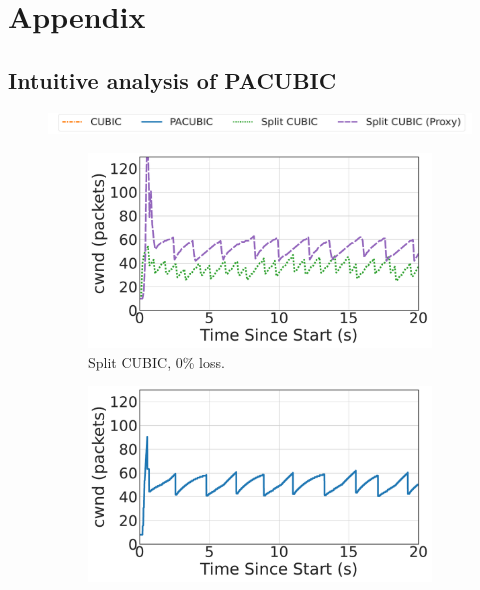\chapter{Appendix}

\section{Intuitive analysis of PACUBIC}
\label{sec:appendix:pacubic}

\begin{figure}[h]
\centering
\includegraphics[width=0.8\linewidth]{sidekick-paper/figures/cwnd/cwnd_legend.pdf}\\
\begin{subfigure}{0.32\linewidth}
	\includegraphics[width=\linewidth]{sidekick-paper/figures/cwnd/cwnd_split_loss0p.pdf}
	\caption{Split CUBIC, 0\% loss.}
	\label{fig:time-cwnd:split-loss0p}
\end{subfigure}
\begin{subfigure}{0.32\linewidth}
	\includegraphics[width=\linewidth]{sidekick-paper/figures/cwnd/cwnd_pacubic_loss0p.pdf}

\end{subfigure}
\end{figure}
